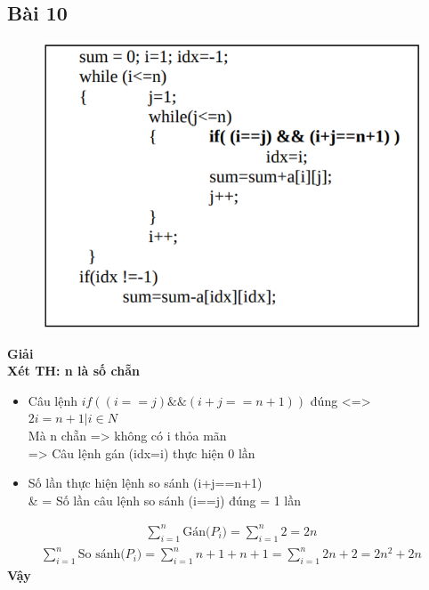 \documentclass[10pt,a4paper]{article}
\begin{document}
\subsection*{Bài 10} %
    \begin{figure}[H]
        \centering\includegraphics[scale=.6]{images/bai10.png} \\
    \end{figure} 
    \textbf{Giải} \\
    \textbf{Xét TH: n là số chẵn} \\
    \begin{itemize}
        \item Câu lệnh $if((i==j)\&\&(i+j==n+1))$ đúng <=> $2i = n+1 | i\in N$ 
        \\ Mà n chẵn => không có i thỏa mãn
        \\ => Câu lệnh gán (idx=i) thực hiện 0 lần
        \item Số lần thực hiện lệnh so sánh (i+j==n+1) \\
        &  = Số lần câu lệnh so sánh (i==j) đúng = 1 lần
    \end{itemize}
    \begin{align*}
         \sum_{i=1}^{n}{\text{Gán($P_i$)}}
         = \sum_{i=1}^{n}{2} = 2n
    \end{align*}
    \begin{align*}
        \sum_{i=1}^{n}{\text{So sánh($P_i$)}} = 
        \sum_{i=1}^{n}{n+1+n + 1} = \sum_{i=1}^{n}{2n+2} = 2n^2+2n
    \end{align*}
    \textbf{Vậy}
\end{document}
